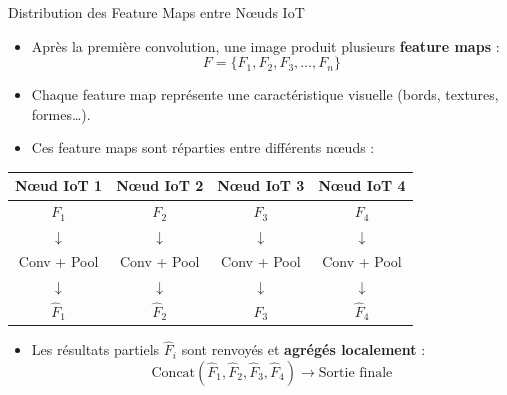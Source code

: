 \documentclass{beamer}
\begin{document}
\begin{frame}{Distribution des Feature Maps entre Nœuds IoT}
\begin{itemize}
    \item Après la première convolution, une image produit plusieurs \textbf{feature maps} :
    \[
    F = \{F_1, F_2, F_3, \dots, F_n\}
    \]
    \item Chaque feature map représente une caractéristique visuelle (bords, textures, formes…).
    \item Ces feature maps sont réparties entre différents nœuds :
\end{itemize}

\vspace{0.2cm}
\begin{center}
\scriptsize
\begin{tabular}{c c c c}
\textbf{Nœud IoT 1} & \textbf{Nœud IoT 2} & \textbf{Nœud IoT 3} & \textbf{Nœud IoT 4} \\
\hline
$F_1$ & $F_2$ & $F_3$ & $F_4$ \\
$\downarrow$ & $\downarrow$ & $\downarrow$ & $\downarrow$ \\
Conv + Pool & Conv + Pool & Conv + Pool & Conv + Pool \\
$\downarrow$ & $\downarrow$ & $\downarrow$ & $\downarrow$ \\
$\hat{F}_1$ & $\hat{F}_2$ & $\hat{F}_3$ & $\hat{F}_4$ \\
\end{tabular}
\end{center}

\vspace{0.3cm}
\begin{itemize}
    \item Les résultats partiels $\hat{F}_i$ sont renvoyés et \textbf{agrégés localement} :
    \[
    \text{Concat}(\hat{F}_1, \hat{F}_2, \hat{F}_3, \hat{F}_4) \rightarrow \text{Sortie finale}
    \]
\end{itemize}
\end{frame}
\end{document}
